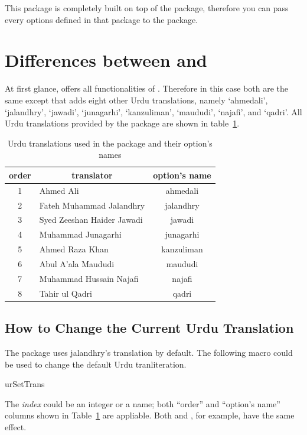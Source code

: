 \documentclass[a4paper]{ltxdoc}
\begin{document}
This package is completely built on top of the  package, therefore you can pass every options
defined in that package to the  package. 

\section{Differences between  and }
At first glance,   offers all functionalities of . Therefore in this case 
both are the same except that  adds eight other Urdu translations, namely 
`ahmedali', `jalandhry', `jawadi', `junagarhi', `kanzuliman', `maududi', `najafi', and `qadri'.
All Urdu translations provided by the package are shown in table~\ref{tab:urtrans}.

\begin{table}[!htbp]
\centering
\begin{tabular}{|c|l|c|}
    \toprule
    order & \multicolumn{1}{c|}{translator} & option's name \\\midrule
    1 & Ahmed Ali & ahmedali \\
    2 & Fateh Muhammad Jalandhry & jalandhry \\
    3 & Syed Zeeshan Haider Jawadi  & jawadi \\
    4 & Muhammad Junagarhi & junagarhi \\
    5 & Ahmed Raza Khan  &  kanzuliman \\
    6 & Abul A'ala Maududi &  maududi \\
    7 & Muhammad Hussain Najafi &  najafi \\
    8 & Tahir ul Qadri  &  qadri \\
    \bottomrule
\end{tabular}
    \caption{Urdu translations used in the package and their option's names}
    \label{tab:urtrans}
\end{table}

\subsection{How to Change the Current Urdu Translation}
    The  package uses jalandhry's translation by default. 
    The following macro could be used to change the default Urdu tranliteration. 
    \begin{declcs}{urSetTrans}
    \end{declcs}    
    The \textit{index} could be an integer or a name; both ``order'' and ``option's name'' columns
    shown in Table~\ref{tab:urtrans} are appliable. Both  and , for example,
    have the same effect. 
    
\end{document}
